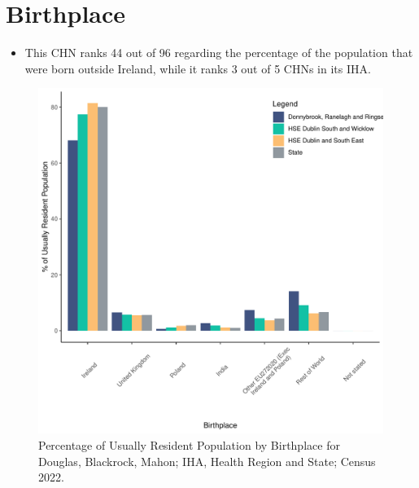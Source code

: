 \documentclass{article}
\begin{document}
\section{Birthplace}\label{sect:Birth}
\begin{itemize}
\item This CHN ranks  44 out of 96 regarding the percentage of the population that were born outside Ireland, while it ranks  3 out of 5 CHNs in its IHA.
\end{itemize}
\begin{figure}[H]
	\centering
	\includegraphics[width = 130mm]{../figures/BirthED.pdf}
	\caption{Percentage of Usually Resident Population by Birthplace for Douglas, Blackrock, Mahon; IHA, Health Region and State; Census 2022.}
	\label{fig:vbnv}
	\end{figure}
	
\end{document}
